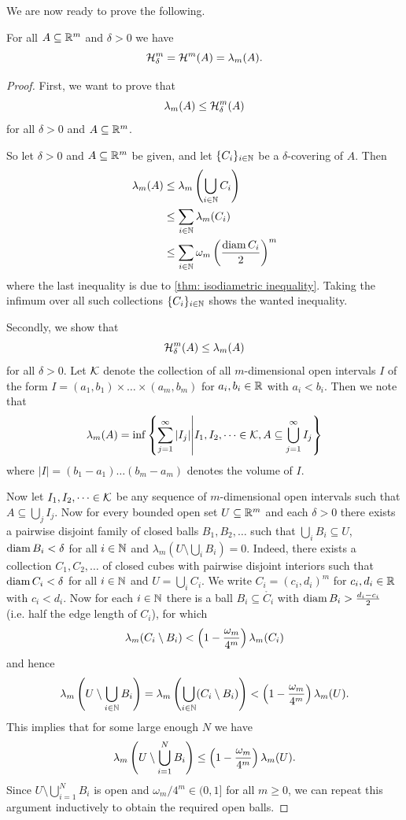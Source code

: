 We are now ready to prove the following.
\begin{theorem}
For all $A \subseteq \mathbb{R}^m$ and $\delta > 0$ we have
\[
    \mathcal{H}_{\delta}^m=\mathcal{H}^m(A)=\lambda_m(A).
\]
\end{theorem}
\begin{proof}
First, we want to prove that
\[
    \lambda_m(A) \le \mathcal{H}_{\delta}^m(A)
\]
for all $\delta > 0$ and $A \subseteq \mathbb{R}^m$.

So let $\delta > 0$ and $A \subseteq \mathbb{R}^m$ be given, and let $\{C_i\}_{i \in \mathbb{N}}$ be a $\delta$-covering of $A$. Then
\begin{align*}
    \lambda_m(A) &\le \lambda_m\left(\bigcup_{i \in \mathbb{N}} C_i\right) \\
    &\le \sum_{i \in \mathbb{N}} \lambda_m(C_i) \\
    &\le \sum_{i \in \mathbb{N}} \omega_m\left(\frac{\operatorname{diam} C_i}{2}\right)^m
\end{align*}
where the last inequality is due to \cref{thm: isodiametric inequality}. Taking the infimum over all such collections $\{C_i\}_{i \in \mathbb{N}}$ shows the wanted inequality.

Secondly, we show that
\[
    \mathcal{H}_{\delta}^m(A) \le \lambda_m(A)
\]
for all $\delta > 0$. Let $\mathcal{K}$ denote the collection of all $m$-dimensional open intervals $I$ of the form $I=(a_1,b_1) \times \dots \times (a_m,b_m)$ for $a_i,b_i \in \mathbb{R}$ with $a_i < b_i$. Then we note that
\[
    \lambda_m(A)=\inf\left\{\sum_{j=1}^{\infty} |I_j| \middle| I_1, I_2, \dots \in \mathcal{K}, A \subseteq \bigcup_{j=1}^{\infty} I_j \right\}
\]
where $|I|=(b_1-a_1)\dots(b_m-a_m)$ denotes the volume of $I$.

Now let $I_1, I_2, \dots \in \mathcal{K}$ be any sequence of $m$-dimensional open intervals such that $A \subseteq \bigcup_{j} I_j$. Now for every bounded open set $U \subseteq \mathbb{R}^m$ and each $\delta > 0$ there exists a pairwise disjoint family of closed balls $B_1, B_2, \dots$ such that $\bigcup_i B_i \subseteq U$, $\operatorname{diam} B_i < \delta$ for all $i \in \mathbb{N}$ and $\lambda_m(U \setminus \bigcup_i B_i) = 0$. Indeed, there exists a collection $C_1,C_2, \dots $ of closed cubes with pairwise disjoint interiors such that $\operatorname{diam} C_i < \delta$ for all $i \in \mathbb{N}$ and $U=\bigcup_i C_i$. We write $C_i=(c_i,d_i)^m$ for $c_i,d_i \in \mathbb{R}$ with $c_i<d_i$. Now for each $i \in \mathbb{N}$ there is a ball $B_i \subseteq \mathring{C_i}$ with $\operatorname{diam} B_i > \frac{d_i-c_i}{2}$ (i.e. half the edge length of $C_i$), for which
\[
    \lambda_m(C_i \setminus B_i) < \left(1-\frac{\omega_m}{4^m}\right)\lambda_m(C_i)
\]
and hence
\[
    \lambda_m\left(U \setminus \bigcup_{i \in \mathbb{N}} B_i\right) = \lambda_m\left(\bigcup_{i \in \mathbb{N}} (C_i \setminus B_i) \right) < \left(1-\frac{\omega_m}{4^m}\right)\lambda_m(U).
\]
This implies that for some large enough $N$ we have
\[
    \lambda_m\left(U \setminus \bigcup_{i = 1}^N B_i\right) \le \left(1-\frac{\omega_m}{4^m}\right)\lambda_m(U).
\]
Since $U \setminus \bigcup_{i = 1}^N B_i$ is open and $\omega_m/4^m\in (0, 1]$ for all $m \ge 0$, we can repeat this argument inductively to obtain the required open balls.


\end{proof}
